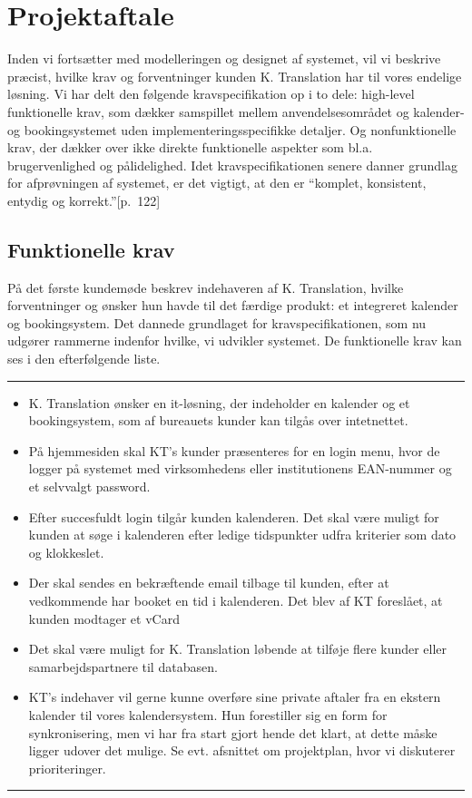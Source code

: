 \documentclass[12pt]{article}   %
\begin{document}
\section{Projektaftale}
Inden vi fortsætter med modelleringen og designet af systemet, vil vi beskrive
præcist, hvilke krav og forventninger kunden K. Translation har til vores
endelige løsning. Vi har delt den følgende kravspecifikation op i to dele:
high-level funktionelle krav, som dækker samspillet mellem anvendelsesområdet og
kalender- og bookingsystemet uden implementeringsspecifikke detaljer. Og
nonfunktionelle krav, der dækker over ikke direkte funktionelle aspekter som
bl.a. brugervenlighed og pålidelighed. Idet kravspecifikationen senere danner
grundlag for afprøvningen af systemet, er det vigtigt, at den er ``komplet,
konsistent, entydig og korrekt.''\cite{oose}[p.~122] \\

\subsection{Funktionelle krav}
På det første kundemøde beskrev indehaveren af K. Translation, hvilke
forventninger og ønsker hun havde til det færdige produkt: et integreret
kalender og bookingsystem. Det dannede grundlaget for kravspecifikationen, som
nu udgører rammerne indenfor hvilke, vi udvikler systemet. De funktionelle
krav kan ses i den efterfølgende liste.\\


\rule{120mm}{1mm}
\begin{itemize}
\item K. Translation ønsker en it-løsning, der indeholder en kalender og et
	bookingsystem, som af bureauets kunder kan tilgås over intetnettet.
\item På hjemmesiden skal KT's kunder præsenteres for en login menu, hvor de
	logger på systemet med virksomhedens eller institutionens EAN-nummer
	og et selvvalgt password. 
\item Efter succesfuldt login tilgår kunden kalenderen. Det skal være muligt
	for kunden at søge i kalenderen efter ledige tidspunkter udfra kriterier 
	som dato og klokkeslet. 
\item Der skal sendes en bekræftende email tilbage til kunden, efter at
	vedkommende har booket en tid i kalenderen. Det blev af KT foreslået,
	at kunden modtager et vCard   
\item Det skal være muligt for K. Translation løbende at tilføje flere kunder 
	eller samarbejdspartnere til databasen. 
\item KT's indehaver vil gerne kunne overføre sine private aftaler fra en
	ekstern kalender til vores kalendersystem. Hun forestiller sig en form
	for synkronisering, men vi har fra start gjort hende det klart, at
	dette måske ligger udover det mulige. Se evt. afsnittet om
	projektplan, hvor vi diskuterer prioriteringer. 
\end{itemize}
\rule{120mm}{1mm}
\vspace{0.5cm}
\end{document}
